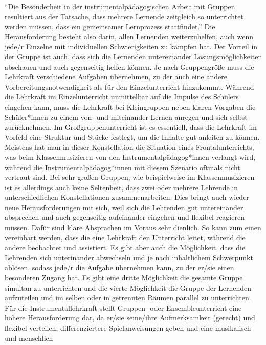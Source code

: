\enquote{Die Besonderheit in der instrumentalpädagogischen Arbeit mit Gruppen
resultiert aus der Tatsache, dass mehrere Lernende zeitgleich so unterrichtet
werden müssen, dass ein gemeinsamer Lernprozess stattfindet.}
\autocite[221]{busch:grundwissen_instrumentalpaedagogik} Die Herausforderung
besteht also darin, allen Lernenden weiterzuhelfen, auch wenn jede/r Einzelne
mit individuellen Schwierigkeiten zu kämpfen hat. Der Vorteil in der Gruppe ist
auch, dass sich die Lernenden untereinander Lösungsmöglichkeiten abschauen und
auch gegenseitig helfen können. Je nach Gruppengröße muss die Lehrkraft
verschiedene Aufgaben übernehmen, zu der auch eine andere
Vorbereitungsnotwendigkeit als für den Einzelunterricht hinzukommt. Während die
Lehrkraft im Einzelunterricht unmittelbar auf die Impulse des Schülers eingehen
kann, muss die Lehrkraft bei Kleingruppen neben klaren Vorgaben die
Schüler*innen zu einem von- und miteinander Lernen anregen und sich selbst
zurücknehmen. Im Großgruppenunterricht ist es essentiell, dass die Lehrkraft im
Vorfeld eine Struktur und Stücke festlegt, um die Inhalte gut anleiten zu
können.\autocite[220]{busch:grundwissen_instrumentalpaedagogik} Meistens hat man
in dieser Konstellation die Situation eines Frontalunterrichts, was beim
Klassenmusizieren von den Instrumentalpädagog*innen verlangt wird, während die
Instrumentalpädagog*innen mit diesem Szenario oftmals nicht vertraut sind. Bei
sehr großen Gruppen, wie beispielweise im Klassenmusizieren ist es allerdings
auch keine Seltenheit, dass zwei oder mehrere Lehrende in unterschiedlichen
Konstellationen zusammenarbeiten. Dies bringt auch wieder neue Herausforderungen
mit sich, weil sich die Lehrenden gut untereinander absprechen und auch
gegenseitig aufeinander eingehen und flexibel reagieren müssen. Dafür sind klare
Absprachen im Voraus sehr dienlich. So kann zum einen vereinbart werden, dass
die eine Lehrkraft den Unterricht leitet, während die andere beobachtet
und assistiert. Es gibt aber auch die Möglichkeit, dass die Lehrenden sich
unterinander abwechseln und je nach inhaltlichem Schwerpunkt ablösen, sodass
jede/r die Aufgabe übernehmen kann, zu der er/sie einen besonderen Zugang hat.
Es gibt eine dritte Möglichkeit die gesamte Gruppe simultan zu unterrichten und
die vierte Möglichkeit die Gruppe der Lernenden aufzuteilen und im selben oder
in getrennten Räumen parallel zu unterrichten. Für die Instrumentallehrkraft
stellt Gruppen- oder Ensembleunterricht eine höhere Herausforderung dar, da
er/sie seine/ihre Aufmerksamkeit (gerecht) und flexibel verteilen,
differenziertere Spielanweisungen geben und eine musikalisch und menschlich
